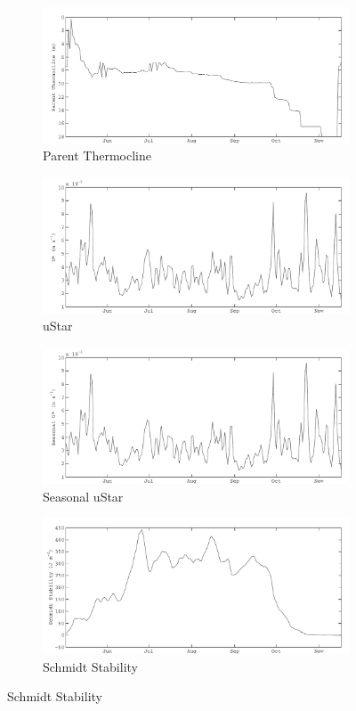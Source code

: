 \begin{figure}
\begin{subfigure}{\lafigsize}
			\caption{Parent Thermocline}
			\includegraphics[width=\textwidth]{figures/Sparkling_SthermD.pdf}
		\end{subfigure}
		\begin{subfigure}{\lafigsize}
			\caption{uStar}
			\includegraphics[width=\textwidth]{figures/Sparkling_uSt.pdf}
		\end{subfigure}
		\begin{subfigure}{\lafigsize}
			\caption{Seasonal uStar}
			\includegraphics[width=\textwidth]{figures/Sparkling_SuSt.pdf}
		\end{subfigure}
		\begin{subfigure}{\lafigsize}
			\caption{Schmidt Stability}
			\includegraphics[width=\textwidth]{figures/Sparkling_St.pdf}

\end{subfigure}
\end{figure}
